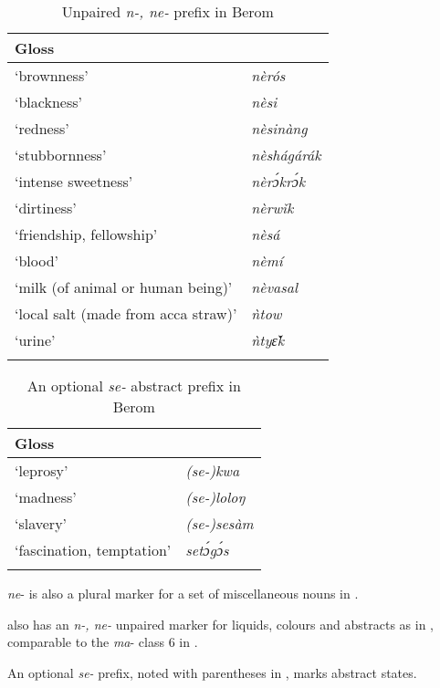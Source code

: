 \documentclass[output=paper]{langsci/langscibook}
\begin{document}
\begin{table}[p]
\caption{ Unpaired \textit{n-, ne-} prefix in Berom} 
\label{extab:nomaffplat:7}
\begin{tabularx}{.8\textwidth}{Xl}
\lsptoprule
Gloss 	& \ilit{Berom}\\
\midrule
‘brownness’ 	& \textit{nèrós}\\
‘blackness’ 	& \textit{nèsi}\\
‘redness’ 	& \textit{nèsinàng}\\
‘stubbornness’ 	& \textit{nèshágárák}\\
‘intense sweetness’ 	& \itshape nèrɔ́krɔ́k\\
‘dirtiness’ 	& \textit{nèrwǐk}\\
‘friendship, fellowship’ 	& \textit{nèsá}\\
‘blood’ 	& \textit{nèmí}\\
‘milk (of animal or human being)’ 	& \textit{nèvasal}\\
‘local salt (made from acca straw)’ 	& \textit{ǹtow}\\
‘urine’ 	& \itshape ǹtyɛ̌k\\
\lspbottomrule
\end{tabularx}
\end{table}

\begin{table}[p]
\caption{An optional \textit{se-} abstract prefix in Berom}
\label{extab:nomaffplat:8}
\begin{tabularx}{.8\textwidth}{Xl}
\lsptoprule
Gloss 	& \ilit{Berom}\\
\midrule
‘leprosy’ 	&  \itshape (se-)kwa\\
‘madness’ 	&  \textit{(se-)loloŋ}\\
‘slavery’ 	&  \itshape (se-)sesàm\\
‘fascination, temptation’ 	&  \itshape setɔ́gɔ́s\\
\lspbottomrule
\end{tabularx}
\end{table}

  
   
\textit{ne}- is also a plural marker for a set of miscellaneous nouns in .
 
 also has an \textit{n-, ne-} unpaired marker for liquids, colours and abstracts as in , comparable to the \textit{ma}- class 6 in .


An optional \textit{se-} prefix, noted with parentheses in , marks abstract states.
\end{document}
